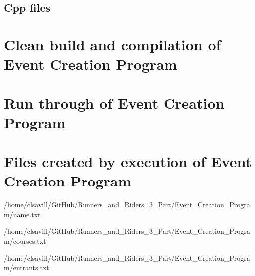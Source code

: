 \documentclass[a4paper,12pt]{article}
\begin{document}
\subsection{Cpp files}





\section{Clean build and compilation of Event Creation Program}


\section{Run through of Event Creation Program}


\section{Files created by execution of Event Creation Program}

{/home/clsavill/GitHub/Runners_and_Riders_3_Part/Event_Creation_Program/name.txt}


{/home/clsavill/GitHub/Runners_and_Riders_3_Part/Event_Creation_Program/courses.txt}


{/home/clsavill/GitHub/Runners_and_Riders_3_Part/Event_Creation_Program/entrants.txt}
\end{document}
